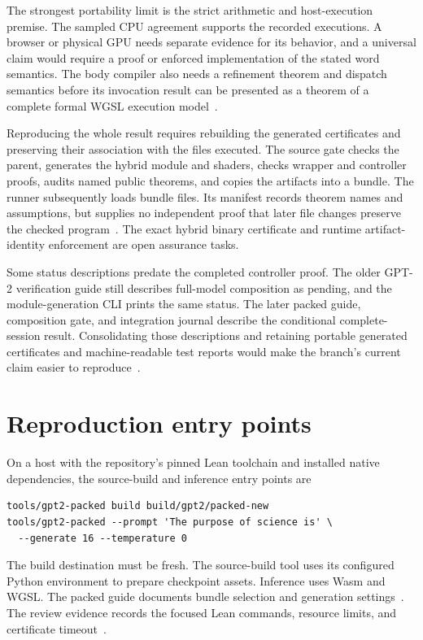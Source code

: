 \documentclass[11pt]{article}
\begin{document}
The strongest portability limit is the strict arithmetic and host-execution premise.  The sampled CPU agreement supports the recorded executions.  A browser or physical GPU needs separate evidence for its behavior, and a universal claim would require a proof or enforced implementation of the stated word semantics.  The body compiler also needs a refinement theorem and dispatch semantics before its invocation result can be presented as a theorem of a complete formal WGSL execution model~\cite{wgsl,execution}.

Reproducing the whole result requires rebuilding the generated certificates and preserving their association with the files executed.  The source gate checks the parent, generates the hybrid module and shaders, checks wrapper and controller proofs, audits named public theorems, and copies the artifacts into a bundle.  The runner subsequently loads bundle files.  Its manifest records theorem names and assumptions, but supplies no independent proof that later file changes preserve the checked program~\cite{build,host}.  The exact hybrid binary certificate and runtime artifact-identity enforcement are open assurance tasks.

Some status descriptions predate the completed controller proof.  The older GPT-2 verification guide still describes full-model composition as pending, and the module-generation CLI prints the same status.  The later packed guide, composition gate, and integration journal describe the conditional complete-session result.  Consolidating those descriptions and retaining portable generated certificates and machine-readable test reports would make the branch's current claim easier to reproduce~\cite{packedguide,journal,build,bodytests}.

\section{Reproduction entry points}

On a host with the repository's pinned Lean toolchain and installed native dependencies, the source-build and inference entry points are
\begin{verbatim}
tools/gpt2-packed build build/gpt2/packed-new
tools/gpt2-packed --prompt 'The purpose of science is' \
  --generate 16 --temperature 0
\end{verbatim}
The build destination must be fresh.  The source-build tool uses its configured Python environment to prepare checkpoint assets.  Inference uses Wasm and WGSL.  The packed guide documents bundle selection and generation settings~\cite{packedguide,build}.  The review evidence records the focused Lean commands, resource limits, and certificate timeout~\cite{review}.
\end{document}
